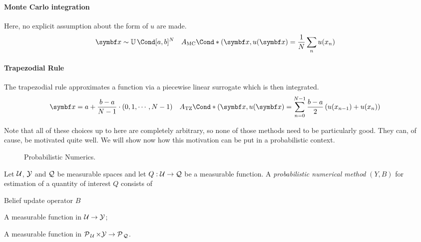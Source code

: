 \paragraph{Monte Carlo integration}
Here, no explicit assumption about the form of $u$ are made.
\begin{align}
    \mat{x}
     & \sim \Uniform{[a, b]^N}
     & \Fun*{A_{\text{MC}}}{(\mat{x}, u(\mat{x})}
     & = \frac{1}{N} \sum_n u(x_n)
\end{align}

\paragraph{Trapezodial Rule}
The trapezodial rule approximates a function via a piecewise linear surrogate which is then integrated.
\begin{align}
    \mat{x}
     & = a + \frac{b - a}{N - 1} \cdot (0, 1, \cdots, N - 1)
     & \Fun*{A_{\text{TZ}}}{(\mat{x}, u(\mat{x})}
     & = \sum_{n=0}^{N - 1} \frac{b - a}{2} \left( u(x_{n-1}) + u(x_n) \right)
\end{align}

Note that all of these choices up to here are completely arbitrary, so none of those methods need to be particularly good.
They can, of cause, be motivated quite well.
We will show now how this motivation can be put in a probabilistic context.


\begin{figure}[t]
    \centering
    
    \caption[Probabilistic Numerics]{
        Probabilistic Numerics.
        \label{fig:probabilistic_numerics:probabilistic_numerics}
    }
\end{figure}
\begin{definition}
    \label{def:probabilistic_numerics:probabilistic_numerical_method}
    Let $\mathcal{U}$, $\mathcal{Y}$ and $\mathcal{Q}$ be measurable spaces and let $Q: \mathcal{U} \to \mathcal{Q}$ be a measurable function.
    A \emph{probabilistic numerical method} $(Y, B)$ for estimation of a quantity of interest $Q$ consists of
    \begin{labeling}{Belief update operator $B$\quad}
        \item[Information operator $Y$] A measurable function in $\mathcal{U} \to \mathcal{Y}$;
        \item[Belief update operator $B$] A measurable function in $\operatorname{\mathcal{P}\mkern2mu}_{\mathcal{U}} \times \mathcal{Y} \to \operatorname{\mathcal{P}\mkern2mu}_{\mathcal{Q}}$.
    \end{labeling}
\end{definition}

